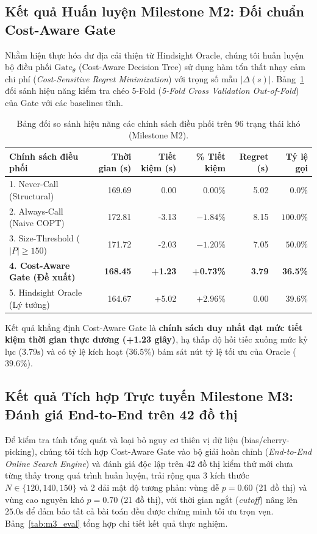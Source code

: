 \documentclass[11pt,a4paper]{article}
\begin{document}
\subsection{Kết quả Huấn luyện Milestone M2: Đối chuẩn Cost-Aware Gate}
Nhằm hiện thực hóa dư địa cải thiện từ Hindsight Oracle, chúng tôi huấn luyện bộ điều phối $\text{Gate}_\theta$ (Cost-Aware Decision Tree) sử dụng hàm tổn thất nhạy cảm chi phí (\textit{Cost-Sensitive Regret Minimization}) với trọng số mẫu $|\Delta(s)|$. Bảng~\ref{tab:m2_eval} đối sánh hiệu năng kiểm tra chéo 5-Fold (\textit{5-Fold Cross Validation Out-of-Fold}) của Gate với các baselines tĩnh.

\begin{table}[ht]
\centering
\small
\setlength{\tabcolsep}{4.5pt}
\caption{Bảng đối so sánh hiệu năng các chính sách điều phối trên 96 trạng thái khó (Milestone M2).}
\label{tab:m2_eval}
\begin{tabularx}{\linewidth}{Xrrrrr}
\toprule
Chính sách điều phối & Thời gian (s) & Tiết kiệm (s) & \% Tiết kiệm & Regret (s) & Tỷ lệ gọi \\
\midrule
1. Never-Call (Structural) & 169.69 & 0.00 & $0.00\%$ & 5.02 & $0.0\%$ \\
2. Always-Call (Naive COPT) & 172.81 & -3.13 & $-1.84\%$ & 8.15 & $100.0\%$ \\
3. Size-Threshold ($|P| \ge 150$) & 171.72 & -2.03 & $-1.20\%$ & 7.05 & $50.0\%$ \\
\midrule
\textbf{4. Cost-Aware Gate (Đề xuất)} & \textbf{168.45} & \textbf{+1.23} & \textbf{+0.73\%} & \textbf{3.79} & \textbf{36.5\%} \\
\midrule
5. Hindsight Oracle (Lý tưởng) & 164.67 & +5.02 & $+2.96\%$ & 0.00 & $39.6\%$ \\
\bottomrule
\end{tabularx}
\end{table}

Kết quả khẳng định Cost-Aware Gate là \textbf{chính sách duy nhất đạt mức tiết kiệm thời gian thực dương (+1.23 giây)}, hạ thấp độ hối tiếc xuống mức kỷ lục ($3.79\text{s}$) và có tỷ lệ kích hoạt ($36.5\%$) bám sát nút tỷ lệ tối ưu của Oracle ($39.6\%$).

\subsection{Kết quả Tích hợp Trực tuyến Milestone M3: Đánh giá End-to-End trên 42 đồ thị}
Để kiểm tra tính tổng quát và loại bỏ nguy cơ thiên vị dữ liệu (bias/cherry-picking), chúng tôi tích hợp Cost-Aware Gate vào bộ giải hoàn chỉnh (\textit{End-to-End Online Search Engine}) và đánh giá độc lập trên 42 đồ thị kiểm thử mới chưa từng thấy trong quá trình huấn luyện, trải rộng qua 3 kích thước $N \in \{120, 140, 150\}$ và 2 dải mật độ tương phản: vùng dễ $p = 0.60$ (21 đồ thị) và vùng cao nguyên khó $p = 0.70$ (21 đồ thị), với thời gian ngắt (\textit{cutoff}) nâng lên $25.0\text{s}$ để đảm bảo tất cả bài toán đều được chứng minh tối ưu trọn vẹn. Bảng~\ref{tab:m3_eval} tổng hợp chi tiết kết quả thực nghiệm.
\end{document}

